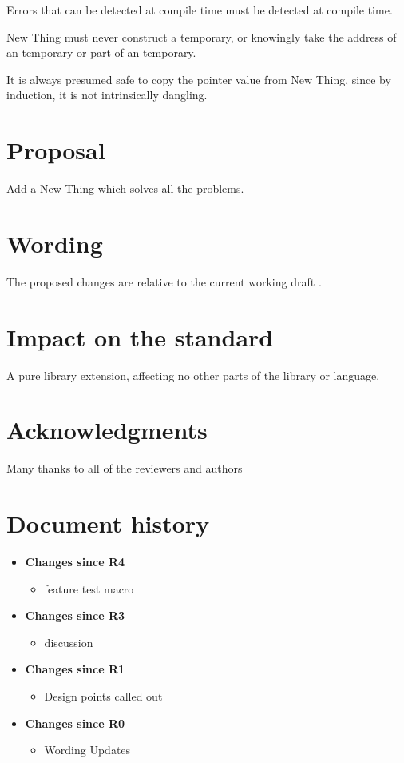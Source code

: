 \documentclass[a4paper,10pt,oneside,openany,final,article]{memoir}
\begin{document}
Errors that can be detected at compile time must be detected at compile time.

New Thing must never construct a temporary, or knowingly take the address of an temporary or part of an temporary.

It is always presumed safe to copy the pointer value from New Thing, since by induction, it is not intrinsically dangling.

\chapter{Proposal}

Add a New Thing which solves all the problems.

\chapter{Wording}

The proposed changes are relative to the current working draft \cite{N5001}.


\begin{wording}



\end{wording}

\chapter{Impact on the standard}

A pure library extension, affecting no other parts of the library or language.

\chapter{Acknowledgments}
Many thanks to all of the reviewers and authors

\chapter*{Document history}

\begin{itemize}
\item \textbf{Changes since R4}
  \begin{itemize}
  \item feature test macro
  \end{itemize}
\item \textbf{Changes since R3}
  \begin{itemize}
  \item discussion
  \end{itemize}
\item \textbf{Changes since R1}
  \begin{itemize}
  \item Design points called out
  \end{itemize}
\item \textbf{Changes since R0}
  \begin{itemize}
  \item Wording Updates
  \end{itemize}
\end{itemize}
\end{document}
